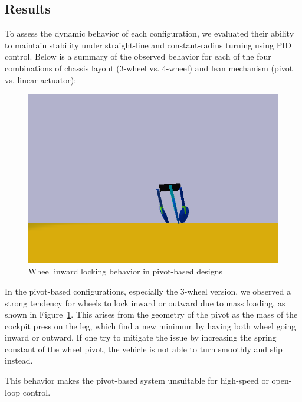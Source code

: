 \subsection{Results}

To assess the dynamic behavior of each configuration, we evaluated their ability to maintain stability under straight-line and constant-radius turning using PID control. Below is a summary of the observed behavior for each of the four combinations of chassis layout (3-wheel vs. 4-wheel) and lean mechanism (pivot vs. linear actuator):

\begin{figure}
    \centering
    \vspace{-1em}
    \includegraphics[width=\linewidth]{Figures/ch7_inwardWheel.png}
    \caption{Wheel inward locking behavior in pivot-based designs}
    \label{fig:wheel_instability}
    \vspace{-1em}
\end{figure}

In the pivot-based configurations, especially the 3-wheel version, we observed a strong tendency for wheels to lock inward or outward due to mass loading, as shown in Figure~\ref{fig:wheel_instability}. This arises from the geometry of the pivot as the mass of the cockpit press on the leg, which find a new minimum by having both wheel going inward or outward. If one try to mitigate the issue by increasing the spring constant of the wheel pivot, the vehicle is not able to turn smoothly and slip instead.

This behavior makes the pivot-based system unsuitable for high-speed or open-loop control. 

